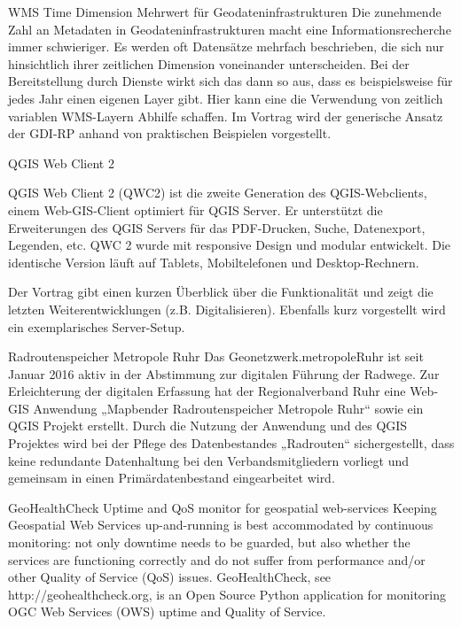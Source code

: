 %
{WMS Time Dimension}%
{Mehrwert für Geodateninfrastrukturen}%
{
  Die zunehmende Zahl an Metadaten in Geodateninfrastrukturen macht eine Informationsrecherche immer schwieriger. Es werden oft Datensätze mehrfach beschrieben, die sich nur hinsichtlich ihrer zeitlichen Dimension voneinander unterscheiden. Bei der Bereitstellung durch Dienste wirkt sich das dann so aus, dass es beispielsweise für jedes Jahr einen eigenen Layer gibt. Hier kann eine die Verwendung von zeitlich variablen WMS-Layern Abhilfe schaffen. Im Vortrag wird der generische Ansatz der GDI-RP anhand von praktischen Beispielen vorgestellt.%
}

%
{QGIS Web Client 2}%
{}%
{
  QGIS Web Client 2 (QWC2) ist die zweite Generation des QGIS-Webclients, einem Web-GIS-Client optimiert für QGIS Server. Er unterstützt die Erweiterungen des QGIS Servers für das PDF-Drucken, Suche, Datenexport, Legenden, etc. QWC 2 wurde mit responsive Design und modular entwickelt. Die identische Version läuft auf Tablets, Mobiltelefonen und Desktop-Rechnern.

Der Vortrag gibt einen kurzen Überblick über die Funktionalität und zeigt die letzten Weiterentwicklungen (z.B. Digitalisieren). Ebenfalls kurz vorgestellt wird ein exemplarisches Server-Setup.%
}


%
{Radroutenspeicher Metropole Ruhr}%
{}%
{
Das Geonetzwerk.metropoleRuhr ist seit Januar 2016 aktiv in der Abstimmung zur digitalen
Führung der Radwege. Zur Erleichterung der digitalen Erfassung hat der Regionalverband
Ruhr eine Web-GIS Anwendung „Mapbender Radroutenspeicher Metropole Ruhr“ sowie ein
QGIS Projekt erstellt.
Durch die Nutzung der Anwendung und des QGIS Projektes wird bei der Pflege
des Datenbestandes „Radrouten“ sichergestellt, dass keine redundante Datenhaltung bei den
Verbandsmitgliedern vorliegt und gemeinsam in einen Primärdatenbestand eingearbeitet wird.%
}

%
{GeoHealthCheck}%
{Uptime and QoS monitor for geospatial web-services}%
{
Keeping Geospatial Web Services up-and-running is best accommodated by continuous monitoring: 
not only downtime needs to be guarded, but also whether the services are functioning correctly and
do not suffer from performance and/or other Quality of Service (QoS) issues. GeoHealthCheck, see http://geohealthcheck.org, is an Open Source Python application for monitoring OGC Web Services (OWS) uptime and Quality of Service.%
}

